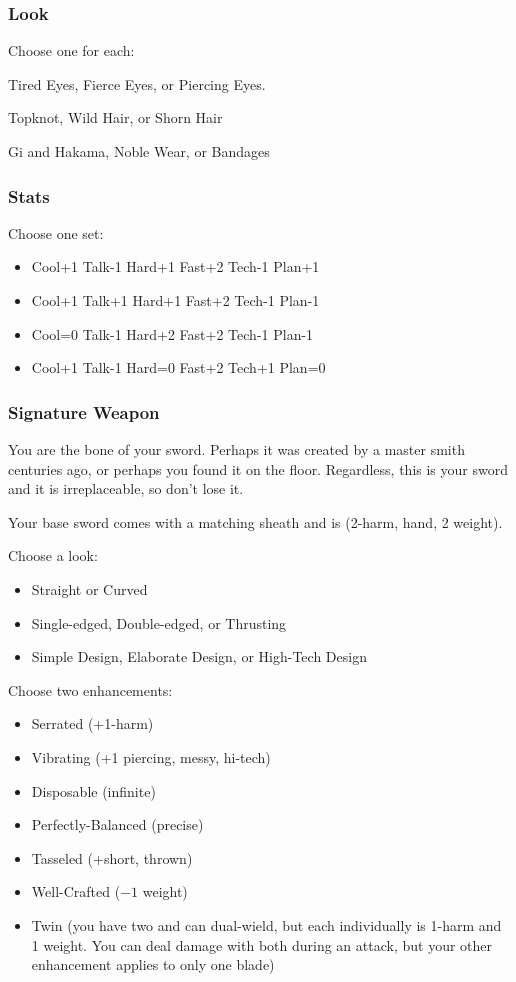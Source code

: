 \subsubsection{Look}

Choose one for each:

Tired Eyes, Fierce Eyes, or Piercing Eyes.

Topknot, Wild Hair, or Shorn Hair

Gi and Hakama, Noble Wear, or Bandages

\subsubsection{Stats}
Choose one set:
\begin{itemize}
\setlength\itemsep{0em}
\item Cool+1 Talk-1 Hard+1 Fast+2 Tech-1 Plan+1
\item Cool+1 Talk+1 Hard+1 Fast+2 Tech-1 Plan-1
\item Cool=0 Talk-1 Hard+2 Fast+2 Tech-1 Plan-1
\item Cool+1 Talk-1 Hard=0 Fast+2 Tech+1 Plan=0
\end{itemize}

\subsubsection{Signature Weapon}
You are the bone of your sword. Perhaps it was created by a master smith centuries ago, or perhaps you found it on the floor. Regardless, this is your sword and it is irreplaceable, so don't lose it.

Your base sword comes with a matching sheath and is (2-harm, hand, 2 weight).

Choose a look:
\begin{itemize}
\item Straight or Curved
\item Single-edged, Double-edged, or Thrusting
\item Simple Design, Elaborate Design, or High-Tech Design
\end{itemize}

Choose two enhancements:
\begin{itemize}
\item Serrated (+1-harm)
\item Vibrating (+1 piercing, messy, hi-tech)
\item Disposable (infinite)
\item Perfectly-Balanced (precise)
\item Tasseled (+short, thrown)
\item Well-Crafted ($-1$ weight)
\item Twin (you have two and can dual-wield, but each individually is 1-harm and 1 weight. You can deal damage with both during an attack, but your other enhancement applies to only one blade)
\end{itemize}

